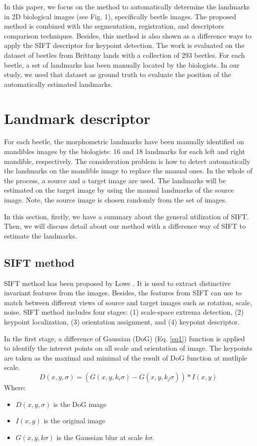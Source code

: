 \documentclass{gretsi}
\begin{document}
In this paper, we focus on the method to automatically determine the landmarks in 2D biological images (see Fig. 1), specifically beetle images. The proposed method is combined with the segmentation, registration, and descriptors comparison techniques. Besides, this method is also shown as a difference ways to apply the SIFT descriptor for keypoint detection. The work is evaluated on the dataset of beetles from Brittany lands with a collection of 293 beetles. For each beetle, a set of landmarks has been manually located by the biologists. In our study, we used that dataset as ground truth to evaluate the position of the automatically estimated landmarks.
\section{Landmark descriptor}
For each beetle, the morphometric landmarks have been manually identified on mandibles images by the biologists: 16 and 18 landmarks for each left and right mandible, respectively. The consideration problem is how to detect automatically the landmarks on the mandible image to replace the manual ones. In the whole of the process, a source and a target image are used. The landmarks will be estimated on the target image by using the manual landmarks of the source image. Note, the source image is chosen randomly from the set of images.

In this section, firstly, we have a summary about the general utilization of SIFT. Then, we will discuss detail about our method with a difference way of SIFT to estimate the landmarks.
\subsection{SIFT method}
\label{secSIFT}
SIFT method has been proposed by Lowe \cite{lowe1999object, lowe2004distinctive}. It is used to extract distinctive invariant features from the images. Besides, the features from SIFT can use to match between different views of source and target images such as rotation, scale, noise. SIFT method includes four stages: (1) scale-space extrema detection, (2) keypoint localization, (3) orientation assignment, and (4) keypoint descriptor.

In the first stage, a difference of Gaussian (DoG) \cite{davidson2006molecular} (Eq. \ref{eq1}) function is applied to identify the interest points on all scale and orientation of image. The keypoints are taken as the maximal and minimal of the result of DoG function at mutliple scale.
\begin{equation}
	D(x,y,\sigma) = (G(x,y,k_i\sigma) - G(x,y,k_j\sigma)) * I(x,y)
	\label{eq1}
\end{equation}
Where:
\begin{itemize}
	\item $D(x,y,\sigma)$ is the DoG image
	\item $I(x,y)$ is the original image
	\item $G(x,y,k\sigma)$ is the Gaussian blur at scale $k\sigma$.
\end{itemize}
\end{document}
